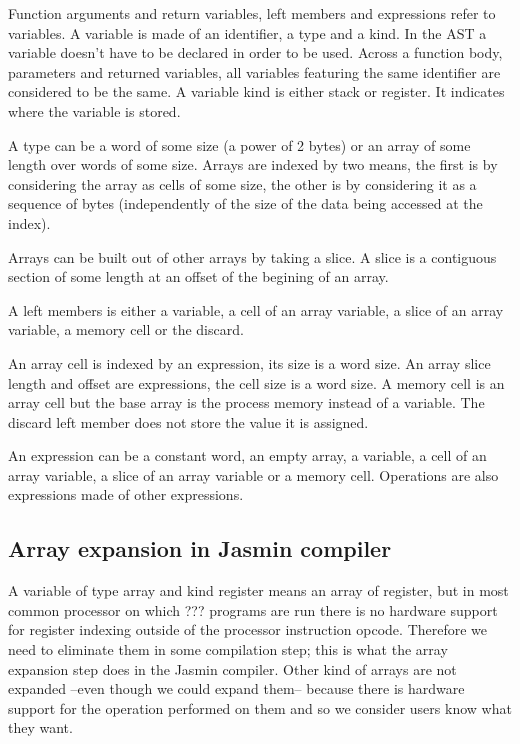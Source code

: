 \documentclass{article}
\begin{document}
Function arguments and return variables, left members and expressions refer to
variables. A variable is made of an identifier, a type and a kind. In the AST a
variable doesn't have to be declared in order to be used. Across a function
body, parameters and returned variables, all variables featuring the same
identifier are considered to be the same. A variable kind is either stack or
register. It indicates where the variable is stored.

\smallskip

A type can be a word of some size (a power of 2 bytes) or an array of some
length over words of some size. Arrays are indexed by two means, the first is
by considering the array as cells of some size, the other is by considering it
as a sequence of bytes (independently of the size of the data being accessed at
the index).

Arrays can be built out of other arrays by taking a slice. A slice is a
contiguous section of some length at an offset of the begining of an array.

\smallskip

A left members is either a variable, a cell of an array variable, a slice of an
array variable, a memory cell or the discard.

An array cell is indexed by an expression, its size is a word size. An array
slice length and offset are expressions, the cell size is a word size. A memory
cell is an array cell but the base array is the process memory instead of a
variable. The discard left member does not store the value it is assigned.

An expression can be a constant word, an empty array, a variable, a cell of an
array variable, a slice of an array variable or a memory cell. Operations are
also expressions made of other expressions.

\subsection{Array expansion in Jasmin compiler}

A variable of type array and kind register means an array of register, but in
most common processor on which ??? programs are run there is no hardware support
for register indexing outside of the processor instruction opcode. Therefore we
need to eliminate them in some compilation step; this is what the array
expansion step does in the Jasmin compiler. Other kind of arrays are not
expanded --even though we could expand them-- because there is hardware support
for the operation performed on them and so we consider users know what they want.
\end{document}
